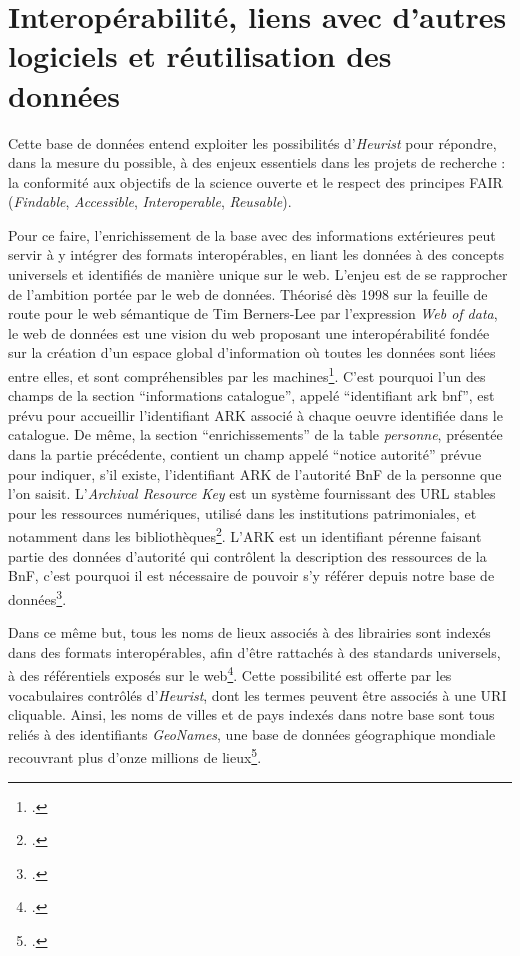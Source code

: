 \newpage 
\section{Interopérabilité, liens avec d'autres logiciels et réutilisation des données}

Cette base de données entend exploiter les possibilités d'\emph{Heurist} pour répondre, dans la mesure du possible, à des enjeux essentiels dans les projets de recherche : la conformité aux objectifs de la science ouverte et le respect des principes FAIR (\emph{Findable}, \emph{Accessible}, \emph{Interoperable}, \emph{Reusable}). 

Pour ce faire, l'enrichissement de la base avec des informations extérieures peut servir à y intégrer  des formats interopérables, en liant les données à des concepts universels et identifiés de manière unique sur le web. L'enjeu est de se rapprocher de l'ambition portée par le web de données. Théorisé dès 1998 sur la feuille de route pour le web sémantique de Tim Berners-Lee par l'expression \emph{Web of data}, le web de données est une vision du web proposant une interopérabilité fondée sur la création d'un espace global d'information où toutes les données sont liées entre elles, et sont compréhensibles par les machines\footcite{bermes_2_2013}. C'est pourquoi l'un des champs de la section \enquote{informations catalogue}, appelé \enquote{identifiant ark bnf}, est prévu pour accueillir l'identifiant ARK associé à chaque oeuvre identifiée dans le catalogue. De même, la section \enquote{enrichissements} de la table \emph{personne}, présentée dans la partie précédente, contient un champ appelé \enquote{notice autorité} prévue pour indiquer, s'il existe, l'identifiant ARK de l'autorité BnF de la personne que l'on saisit. 
L'\emph{Archival Resource Key} est un système fournissant des URL stables pour les ressources numériques, utilisé dans les institutions patrimoniales, et notamment dans les bibliothèques\footcite[p. 34]{hervieu_2024}. L'ARK est un identifiant pérenne faisant partie des données d'autorité qui contrôlent la description des ressources de la BnF, c'est pourquoi il est nécessaire de pouvoir s'y référer depuis notre base de données\footcite{noauthor_donnees_nodate}. 

Dans ce même but, tous les noms de lieux associés à des librairies sont indexés dans des formats interopérables, afin d'être rattachés à des standards universels, à des référentiels exposés sur le web\footcite[Voir \enquote{Présentation de Heurist}]{paillusson_introduction_2022}. Cette possibilité est offerte par les vocabulaires contrôlés d'\emph{Heurist}, dont les termes peuvent être associés à une URI cliquable. Ainsi, les noms de villes et de pays indexés dans notre base sont tous reliés à des identifiants \emph{GeoNames}, une base de données géographique mondiale recouvrant plus d'onze millions de lieux\footcite{noauthor_geonames_nodate}. 

